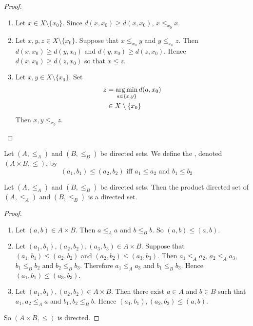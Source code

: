 \documentclass{book}
\begin{document}
	\begin{proof}\
		\begin{enumerate}
			\item Let $x \in X \setminus \{x_0\}$. Since $d(x, x_0) \geq d(x, x_0)$, $x \leq_{x_0} x$.
			\item Let $x, y, z \in X \setminus \{x_0\}$. Suppose that $x \leq_{x_0} y$ and $y \leq_{x_0} z$. Then $d(x, x_0) \geq d(y, x_0)$ and $d(y, x_0) \geq d(z, x_0)$. Hence $d(x, x_0) \geq d(z, x_0)$ so that $x \leq z$.
			\item Let $x,y \in X \setminus \{x_0\}$. Set 
			\begin{align*}
				z 
				&= \operatorname*{arg\,min}\limits_{a \in \{x, y\}} d(a, x_0) \\ 
				& \in X \setminus \{x_0\} 
			\end{align*}
			Then $x, y \leq_{x_0} z$.
		\end{enumerate}
	\end{proof}

	\begin{defn} 
		Let $(A, \leq_A)$ and $(B, \leq_B)$ be directed sets. We define the , denoted $(A \times B, \leq)$, by 
		$$(a_1, b_1) \leq (a_2, b_2) \text{ iff } a_1 \leq a_2 \text{ and } b_1 \leq b_2$$
	\end{defn}

	\begin{ex} 
		Let $(A, \leq_A)$ and $(B, \leq_B)$ be directed sets. Then the product directed set of $(A, \leq_A)$ and $(B, \leq_B)$ is a directed set.
	\end{ex}

	\begin{proof}\
		\begin{enumerate}
			\item Let $(a, b) \in A \times B$. Then $a \leq_A a$ and $b \leq_B b$. So $(a, b) \leq (a ,b)$.
			\item Let $(a_1, b_1), (a_2, b_2), (a_3, b_3) \in A \times B$. Suppose that $(a_1, b_1) \leq (a_2, b_2)$ and $(a_2, b_2) \leq (a_3, b_3)$. Then $a_1 \leq_A a_2$, $a_2 \leq_A a_3$, $b_1 \leq_B b_2$ and $b_2 \leq_B b_3$. Therefore $a_1 \leq_A a_3$ and $b_1 \leq_B b_3$. Hence $(a_1, b_1) \leq (a_3, b_3)$.
			\item Let $(a_1, b_1), (a_2, b_2) \in A \times B$. Then there exist $a \in A$ and $b \in B$ such that $a_1, a_2 \leq_A a$ and $b_1, b_2 \leq_B b$. Hence $(a_1, b_1), (a_2, b_2) \leq (a, b)$.
		\end{enumerate}
		So $(A \times B, \leq)$ is directed.
	\end{proof}
	
\end{document}
